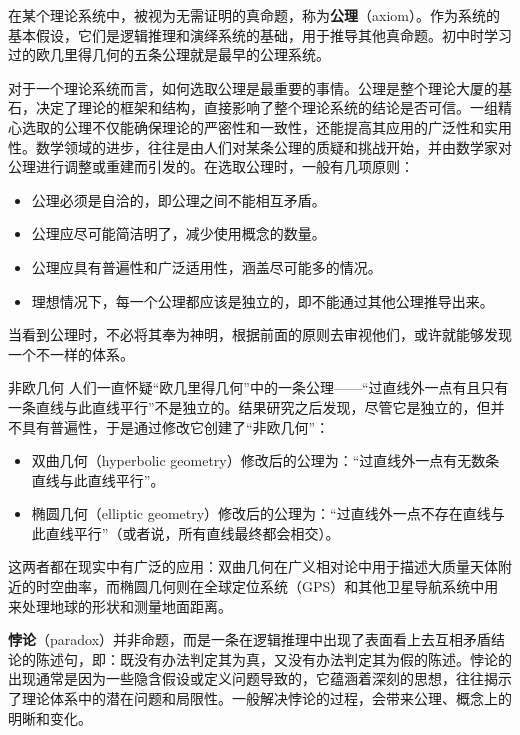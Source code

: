 在某个理论系统中，被视为无需证明的真命题，称为\textbf{公理}（axiom）。作为系统的基本假设，它们是逻辑推理和演绎系统的基础，用于推导其他真命题。初中时学习过的欧几里得几何的五条公理就是最早的公理系统。

对于一个理论系统而言，如何选取公理是最重要的事情。公理是整个理论大厦的基石，决定了理论的框架和结构，直接影响了整个理论系统的结论是否可信。一组精心选取的公理不仅能确保理论的严密性和一致性，还能提高其应用的广泛性和实用性。数学领域的进步，往往是由人们对某条公理的质疑和挑战开始，并由数学家对公理进行调整或重建而引发的。在选取公理时，一般有几项原则：

\begin{itemize}
\item 公理必须是自洽的，即公理之间不能相互矛盾。
\item 公理应尽可能简洁明了，减少使用概念的数量。
\item 公理应具有普遍性和广泛适用性，涵盖尽可能多的情况。
\item 理想情况下，每一个公理都应该是独立的，即不能通过其他公理推导出来。
\end{itemize}

当看到公理时，不必将其奉为神明，根据前面的原则去审视他们，或许就能够发现一个不一样的体系。

\begin{example}{非欧几何}
人们一直怀疑“欧几里得几何”中的一条公理——“过直线外一点有且只有一条直线与此直线平行”不是独立的。结果研究之后发现，尽管它是独立的，但并不具有普遍性，于是通过修改它创建了“非欧几何”：

\begin{itemize}
\item 双曲几何（hyperbolic geometry）修改后的公理为：“过直线外一点有无数条直线与此直线平行”。
\item 椭圆几何（elliptic geometry）修改后的公理为：“过直线外一点不存在直线与此直线平行”（或者说，所有直线最终都会相交）。
\end{itemize}

这两者都在现实中有广泛的应用：双曲几何在广义相对论中用于描述大质量天体附近的时空曲率，而椭圆几何则在全球定位系统（GPS）和其他卫星导航系统中用来处理地球的形状和测量地面距离。
\end{example}

\textbf{悖论}（paradox）并非命题，而是一条在逻辑推理中出现了表面看上去互相矛盾结论的陈述句，即：既没有办法判定其为真，又没有办法判定其为假的陈述。悖论的出现通常是因为一些隐含假设或定义问题导致的，它蕴涵着深刻的思想，往往揭示了理论体系中的潜在问题和局限性。一般解决悖论的过程，会带来公理、概念上的明晰和变化。

